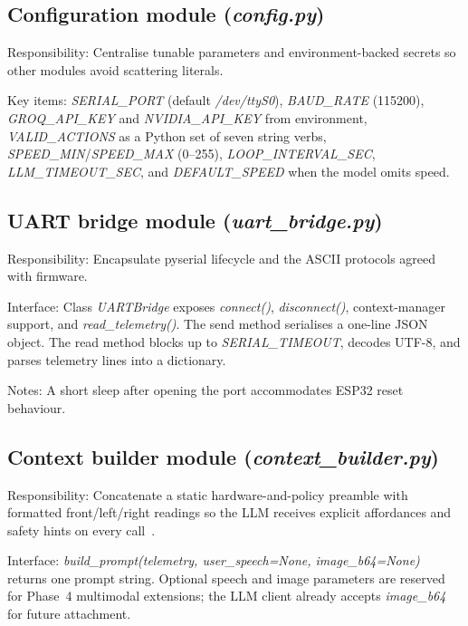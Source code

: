 \subsection[Configuration module]{Configuration module (\textit{config.py})}
\label{subsec:config}

Responsibility: Centralise tunable parameters and environment-backed secrets so other modules avoid scattering literals.

Key items: \textit{SERIAL\_PORT} (default \textit{/dev/ttyS0}), \textit{BAUD\_RATE} (115200), \textit{GROQ\_API\_KEY} and \textit{NVIDIA\_API\_KEY} from environment, \textit{VALID\_ACTIONS} as a Python set of seven string verbs, \textit{SPEED\_MIN}/\textit{SPEED\_MAX} (0--255), \textit{LOOP\_INTERVAL\_SEC}, \textit{LLM\_TIMEOUT\_SEC}, and \textit{DEFAULT\_SPEED} when the model omits speed.

\subsection[UART bridge module]{UART bridge module (\textit{uart\_bridge.py})}
\label{subsec:uart}

Responsibility: Encapsulate pyserial lifecycle and the ASCII protocols agreed with firmware.

Interface: Class \textit{UARTBridge} exposes \textit{connect()}, \textit{disconnect()}, context-manager support, and \textit{read\_telemetry()}. The send method serialises a one-line JSON object. The read method blocks up to \textit{SERIAL\_TIMEOUT}, decodes UTF-8, and parses telemetry lines into a dictionary.


Notes: A short sleep after opening the port accommodates ESP32 reset behaviour.

\subsection[Context builder module]{Context builder module (\textit{context\_builder.py})}
\label{subsec:ctx}

Responsibility: Concatenate a static hardware-and-policy preamble with formatted front/left/right readings so the LLM receives explicit affordances and safety hints on every call~\cite{ahn2022saycan}.

Interface: \textit{build\_prompt(telemetry, user\_speech=None, image\_b64=None)} returns one prompt string. Optional speech and image parameters are reserved for Phase~4 multimodal extensions; the LLM client already accepts \textit{image\_b64} for future attachment.

